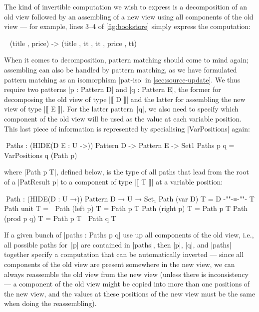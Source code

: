 \documentclass{sigplanconf}
\begin{document}
The kind of invertible computation we wish to express is a decomposition of an old view followed by an assembling of a new view using all components of the old view --- for example, lines 3--4 of \autoref{fig:bookstore} simply express the computation:
\begin{code}
\ { (title , price) -> (title , tt , tt , price , tt) }
\end{code}
When it comes to decomposition, pattern matching should come to mind again; assembling can also be handled by pattern matching, as we have formulated pattern matching as an isomorphism |pat-iso| in \autoref{sec:source-update}.
We thus require two patterns |p : Pattern D| and |q : Pattern E|, the former for decomposing the old view of type |⟦ D ⟧| and the latter for assembling the new view of type |⟦ E ⟧|.
For the latter pattern~|q|, we also need to specify which component of the old view will be used as the value at each variable position.
This last piece of information is represented by specialising |VarPositions| again:
\begin{code}
^^^Paths : (HIDE({D E : U} ->)) Pattern D -> Pattern E -> Set1
Paths p q = VarPositions q (Path p)
\end{code}
where |Path p T|, defined below, is the type of all paths that lead from the root of a |PatResult p| to a component of type |⟦ T ⟧| at a variable position:
\begin{code}
^^^Path : (HIDE({D : U} →)) Pattern D → U → Set₁
Path (var {D})   T = D {-"\kern-2pt"-}≡{-"\kern-2pt"-} T
Path unit        T = ⊥
Path (left   p)  T = Path p T
Path (right  p)  T = Path p T
Path (prod p q)  T = Path p T ⊎ Path q T
\end{code}
If a given bunch of |paths : Paths p q| use up all components of the old view, i.e., all possible paths for~|p| are contained in |paths|, then |p|, |q|, and |paths| together specify a computation that can be automatically inverted --- since all components of the old view are present somewhere in the new view, we can always reassemble the old view from the new view (unless there is inconsistency --- a component of the old view might be copied into more than one positions of the new view, and the values at these positions of the new view must be the same when doing the reassembling).
\end{document}
